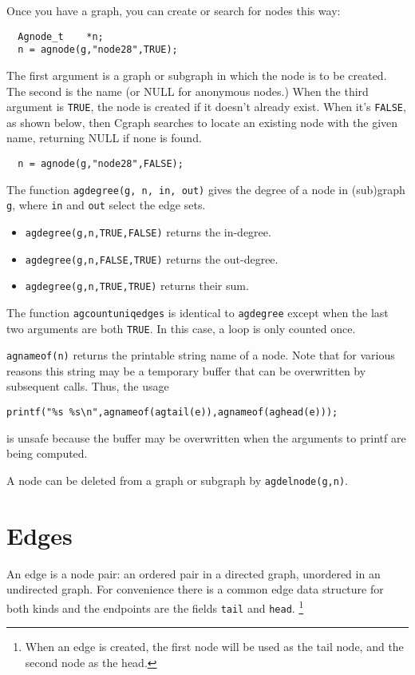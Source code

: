 \documentclass[11pt,letterpaper]{article}
\begin{document}
Once you have a graph, you can create or search for nodes this way:
\begin{verbatim}
  Agnode_t    *n;
  n = agnode(g,"node28",TRUE);
\end{verbatim}

The first argument is a graph or subgraph in which the node
is to be created.  The second is the name (or NULL for anonymous nodes.)
When the third argument is \verb"TRUE", the node is created if it doesn't
already exist.  When it's \verb"FALSE", as shown below, then Cgraph 
searches to locate an existing node with the given name, returning NULL if
none is found.

\begin{verbatim}
  n = agnode(g,"node28",FALSE);
\end{verbatim}

The function \verb"agdegree(g, n, in, out)" gives the degree
of a node in (sub)graph \verb"g", where \verb"in" and \verb"out" select the edge sets.
\begin{itemize}
\item \verb"agdegree(g,n,TRUE,FALSE)" returns the in-degree.
\item \verb"agdegree(g,n,FALSE,TRUE)" returns the out-degree.
\item \verb"agdegree(g,n,TRUE,TRUE)" returns their sum.
\end{itemize}
The function \verb"agcountuniqedges" is identical to {\tt agdegree}
except when the last two arguments are both \verb"TRUE". In this case, a loop is only
counted once.

\verb"agnameof(n)" returns the printable string name of a node.
Note that for various reasons this string may be a temporary
buffer that can be overwritten by subsequent calls.
Thus, the usage
\begin{verbatim}
printf("%s %s\n",agnameof(agtail(e)),agnameof(aghead(e)));
\end{verbatim}
is unsafe because the buffer may be overwritten when the
arguments to printf are being computed.

A node can be deleted from a graph or subgraph by \verb"agdelnode(g,n)".

\section{Edges}
\label{sec:edges}
An edge is a node pair: an ordered pair in a directed graph,
unordered in an undirected graph.  For convenience there is
a common edge data structure for both kinds and the endpoints
are the fields \verb"tail" and \verb"head". \footnote{When an edge is created,
the first node will be used as the tail node, and the second node as the head.}
\end{document}
